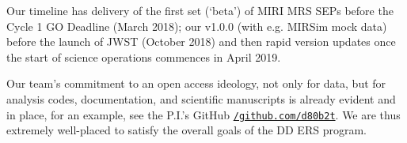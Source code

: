 \smallskip \smallskip
\noindent
Our timeline has delivery of the first set (`beta') of MIRI MRS SEPs
before the Cycle 1 GO Deadline (March 2018); our v1.0.0 (with
e.g. MIRSim mock data) before the launch of JWST (October 2018) and
then rapid version updates once the start of science operations
commences in April 2019.

\smallskip \smallskip
\noindent
Our team's commitment to an open access ideology, not only for data,
but for analysis codes, documentation, and scientific manuscripts is
already evident and in place, for an example, see the P.I.'s GitHub
\href{https://github.com/d80b2t}{{\tt /github.com/d80b2t}}.  
We are thus extremely well-placed to satisfy the overall goals of the
DD ERS program.

\medskip \medskip
\medskip \medskip

